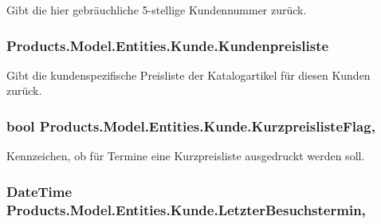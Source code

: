 Gibt die hier gebräuchliche 5-\/stellige Kundennummer zurück. 

\subsubsection[{\texorpdfstring{Kundenpreisliste}{Kundenpreisliste}}]{ Products.\+Model.\+Entities.\+Kunde.\+Kundenpreisliste\hspace{0.3cm}{\ttfamily [get]}}\hypertarget{class_products_1_1_model_1_1_entities_1_1_kunde_ae5f4345337a7cb2a53d7c17716eafc1a}{}\label{class_products_1_1_model_1_1_entities_1_1_kunde_ae5f4345337a7cb2a53d7c17716eafc1a}


Gibt die kundenspezifische Preisliste der Katalogartikel für diesen Kunden zurück. 

\subsubsection[{\texorpdfstring{Kurzpreisliste\+Flag}{KurzpreislisteFlag}}]{\setlength{\rightskip}{0pt plus 5cm}bool Products.\+Model.\+Entities.\+Kunde.\+Kurzpreisliste\+Flag\hspace{0.3cm}{\ttfamily [get]}, {\ttfamily [set]}}\hypertarget{class_products_1_1_model_1_1_entities_1_1_kunde_a7a945f2488892792cdb345445d153bde}{}\label{class_products_1_1_model_1_1_entities_1_1_kunde_a7a945f2488892792cdb345445d153bde}


Kennzeichen, ob für Termine eine Kurzpreisliste ausgedruckt werden soll. 

\subsubsection[{\texorpdfstring{Letzter\+Besuchstermin}{LetzterBesuchstermin}}]{\setlength{\rightskip}{0pt plus 5cm}Date\+Time Products.\+Model.\+Entities.\+Kunde.\+Letzter\+Besuchstermin\hspace{0.3cm}{\ttfamily [get]}, {\ttfamily [set]}}\hypertarget{class_products_1_1_model_1_1_entities_1_1_kunde_a7ddb99d70b5d3fc47a8e12652d547bf4}{}\label{class_products_1_1_model_1_1_entities_1_1_kunde_a7ddb99d70b5d3fc47a8e12652d547bf4}


